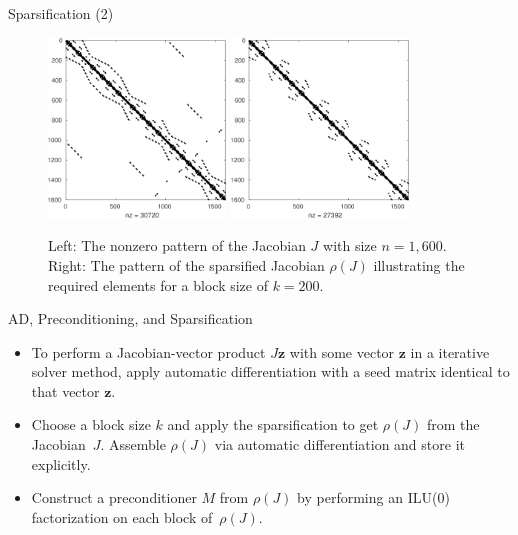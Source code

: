 \documentclass{beamer}
\newcommand{\vek}[1]{{\ensuremath{\mathbf #1}}}
\newcommand{\sparsifysymbol}{\ensuremath{\rho}}
\newcommand{\sparsify}[1]{\ensuremath{\sparsifysymbol(#1)}}
\begin{document}
\begin{frame}{Sparsification (2)}
\begin{figure}
\centering
\includegraphics[width=0.42\textwidth]{quadflow}
\hfill
\includegraphics[width=0.42\textwidth]{block200}

\caption{Left: The nonzero pattern of the Jacobian $J$ with size $n=1,600$. 
Right: The pattern of the
sparsified Jacobian $\sparsify{J}$ illustrating the required elements for a block size of
$k=200$.}
\end{figure}
\end{frame}
\begin{frame}{AD, Preconditioning, and Sparsification}
\begin{itemize}
  \item To perform a Jacobian-vector product $J \vek{z}$ with some vector \vek{z} in a
      iterative solver method, apply automatic differentiation with a seed matrix
      identical to that vector \vek{z}. 
  \item Choose a block size $k$ and apply the sparsification to get \sparsify{J} from
      the Jacobian~$J$. Assemble \sparsify{J} via automatic differentiation and store
      it explicitly.
  \item Construct a preconditioner $M$ from \sparsify{J} by performing an ILU(0)
      factorization on each block of~\sparsify{J}. 
\end{itemize}
\end{frame}
\end{document}
